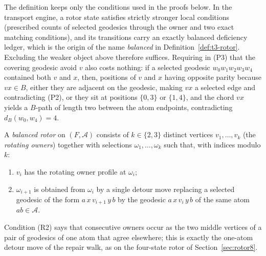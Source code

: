 \begin{remark}\label{rem:t3-profile-scope}
The definition keeps only the conditions used in the proofs below. In
the transport engine, a rotor state satisfies strictly stronger local
conditions (prescribed counts of selected geodesics through the owner
and two exact matching conditions), and its transitions carry an
exactly balanced deficiency ledger, which is the origin of the name
\emph{balanced} in Definition~\ref{def:t3-rotor}. Excluding the weaker
object above therefore suffices. Requiring in (P3) that the covering
geodesic avoid \(v\) also costs nothing: if a selected geodesic
\(w_0w_1w_2w_3w_4\) contained both \(v\) and \(x\), then, positions of
\(v\) and \(x\) having opposite parity because \(vx\in B\), either they
are adjacent on the geodesic, making \(vx\) a selected edge and
contradicting (P2), or they sit at positions \(\{0,3\}\) or
\(\{1,4\}\), and the chord \(vx\) yields a \(B\)-path of length two
between the atom endpoints, contradicting \(d_B(w_0,w_4)=4\).
\end{remark}

\begin{definition}\label{def:t3-rotor}
A \emph{balanced rotor} on \((F,\mathcal A)\) consists of
\(k\in\{2,3\}\) distinct vertices \(v_1,\dots,v_k\) (the
\emph{rotating owners}) together with selections
\(\omega_1,\dots,\omega_k\) such that, with indices modulo \(k\):
\begin{enumerate}[label=\textup{(R\arabic*)}]
\item \(v_i\) has the rotating owner profile at \(\omega_i\);
\item \(\omega_{i+1}\) is obtained from \(\omega_i\) by a single detour
move replacing a selected geodesic of the form
\(a\,x\,v_{i+1}\,y\,b\) by the geodesic \(a\,x\,v_i\,y\,b\) of the same
atom \(ab\in\mathcal A\).
\end{enumerate}
\end{definition}

Condition (R2) says that consecutive owners occur as the two middle
vertices of a pair of geodesics of one atom that agree elsewhere; this
is exactly the one-atom detour move of the repair walk, as on the
four-state rotor of Section~\ref{sec:rotor8}.

